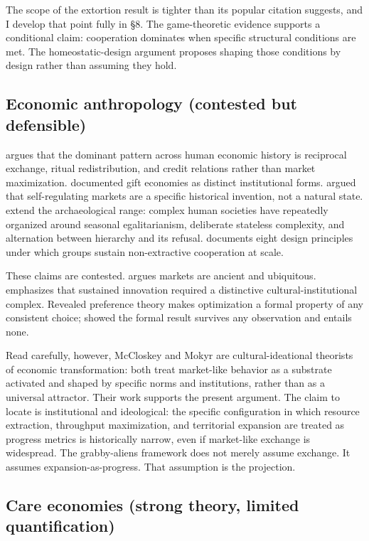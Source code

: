 \documentclass[11pt,twocolumn]{article}
\begin{document}
The scope of the extortion result is tighter than its popular citation
suggests, and I develop that point fully in \S 8. The game-theoretic
evidence supports a conditional claim: cooperation dominates when specific
structural conditions are met. The homeostatic-design argument proposes
shaping those conditions by design rather than assuming they hold.

\subsection{Economic anthropology (contested but defensible)}

\citet{Graeber2011} argues that the dominant pattern across human economic
history is reciprocal exchange, ritual redistribution, and credit
relations rather than market maximization. \citet{Mauss1925} documented
gift economies as distinct institutional forms. \citet{Polanyi1944} argued
that self-regulating markets are a specific historical invention, not a
natural state. \citet{GraeberWengrow2021} extend the archaeological range:
complex human societies have repeatedly organized around seasonal
egalitarianism, deliberate stateless complexity, and alternation between
hierarchy and its refusal. \citet{Ostrom1990} documents eight design
principles under which groups sustain non-extractive cooperation at scale.

These claims are contested. \citet{McCloskey2010,McCloskey2016} argues
markets are ancient and ubiquitous. \citet{Mokyr2016} emphasizes that
sustained innovation required a distinctive cultural-institutional complex.
Revealed preference theory \citep{Varian2005} makes optimization a formal
property of any consistent choice; \citet{Sen1977} showed the formal
result survives any observation and entails none.

Read carefully, however, McCloskey and Mokyr are cultural-ideational
theorists of economic transformation: both treat market-like behavior as a
substrate activated and shaped by specific norms and institutions, rather
than as a universal attractor. Their work supports the present argument.
The claim to locate is institutional and ideological: the specific
configuration in which resource extraction, throughput maximization, and
territorial expansion are treated as progress metrics is historically
narrow, even if market-like exchange is widespread. The grabby-aliens
framework does not merely assume exchange. It assumes
expansion-as-progress. That assumption is the projection.

\subsection{Care economies (strong theory, limited quantification)}
\end{document}
